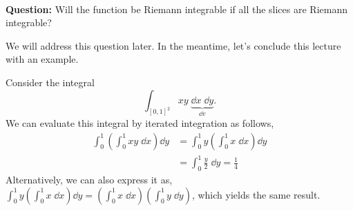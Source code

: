 \documentclass[../Analysis-3.tex]{subfiles}
\begin{document}
\

\textbf{Question:} Will the function be Riemann integrable if all the slices are Riemann integrable?

We will address this question later. In the meantime, let's conclude this lecture with an example.

\begin{Eg}{}{}
  Consider the integral
  \[ \int_{[0,1]^2} xy \; \underbrace{\dd x \; \dd y}_{\dd v}. \]
  We can evaluate this integral by iterated integration as follows,
  \begin{align*}
    \int_{0}^{1} \left( \int_{0}^{1} xy \; \dd x \right) \dd y
     & = \int_{0}^{1} y \left( \int_{0}^{1} x \; \dd x \right) \dd y \\
     & = \int_{0}^{1} \frac{y}{2} \; \dd y = \frac{1}{4}
  \end{align*}
  Alternatively, we can also express it as, $ \displaystyle \int_{0}^{1} y \left( \int_{0}^{1} x \; \dd x \right) \dd y = \left( \int_{0}^{1} x \; \dd x \right) \left( \int_{0}^{1} y \; \dd y \right) $, which yields the same result.
\end{Eg}
\end{document}
